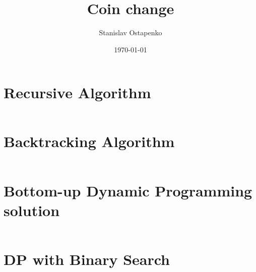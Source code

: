 \documentclass{article}
\begin{document}
    \title{Coin change}
    \author{Stanislav Ostapenko}
    \date{\today}
    \maketitle


    \tableofcontents %
    \lstlistoflistings %

    \clearpage %


\section{Recursive Algorithm}
\begin{lstlisting}[caption=$\mathcal{O}(2^{n})$ Recursive Algorithm]
\end{lstlisting}

\clearpage %
\section{Backtracking Algorithm}
\begin{lstlisting}[caption=$\mathcal{O}(2^{n})$ Backtracking Algorithm]
\end{lstlisting}

\clearpage %
\section{Bottom-up Dynamic Programming solution}
\begin{lstlisting}[caption=$\mathcal{O}(n^{2})$ DP solution]
\end{lstlisting}

\clearpage %
\section{DP with Binary Search}
\begin{lstlisting}[caption=$\mathcal{O}(n\log_{}{n})$ DP with Binary Search]
\end{lstlisting}


\end{document}
